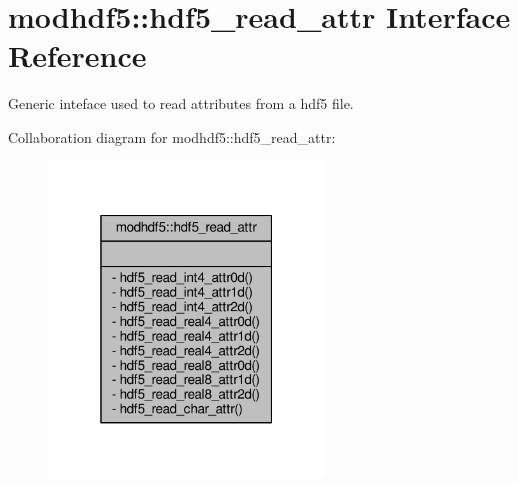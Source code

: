\hypertarget{interfacemodhdf5_1_1hdf5__read__attr}{}\section{modhdf5\+:\+:hdf5\+\_\+read\+\_\+attr Interface Reference}
\label{interfacemodhdf5_1_1hdf5__read__attr}


Generic inteface used to read attributes from a hdf5 file.  




Collaboration diagram for modhdf5\+:\+:hdf5\+\_\+read\+\_\+attr\+:\nopagebreak
\begin{figure}[H]
\begin{center}
\leavevmode
\includegraphics[width=208pt]{interfacemodhdf5_1_1hdf5__read__attr__coll__graph}
\end{center}
\end{figure}
